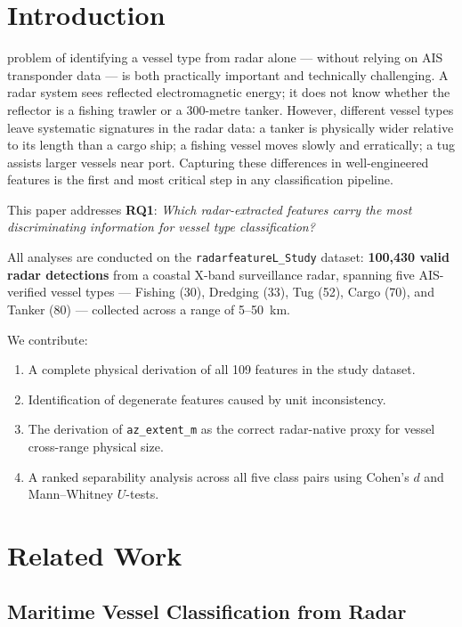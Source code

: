 \documentclass[journal]{IEEEtran}
\begin{document}
\section{Introduction}

 problem of identifying a vessel type from radar alone ---
without relying on AIS transponder data --- is both practically important and
technically challenging.
A radar system sees reflected electromagnetic energy; it does not know whether
the reflector is a fishing trawler or a 300-metre tanker. However, different
vessel types leave systematic signatures in the radar data: a tanker is physically
wider relative to its length than a cargo ship; a fishing vessel moves slowly and
erratically; a tug assists larger vessels near port. Capturing these differences
in well-engineered features is the first and most critical step in any
classification pipeline.

This paper addresses \textbf{RQ1}: \textit{Which radar-extracted features carry
the most discriminating information for vessel type classification?}

All analyses are conducted on the \texttt{radarfeatureL\_Study} dataset:
\textbf{100,430 valid radar detections} from a coastal X-band surveillance
radar, spanning five AIS-verified vessel types — Fishing (30), Dredging (33),
Tug (52), Cargo (70), and Tanker (80) — collected across a range of 5--50~km.

We contribute:
\begin{enumerate}
  \item A complete physical derivation of all 109 features in the study dataset.
  \item Identification of degenerate features caused by unit inconsistency.
  \item The derivation of \texttt{az\_extent\_m} as the correct radar-native
        proxy for vessel cross-range physical size.
  \item A ranked separability analysis across all five class pairs using
        Cohen's $d$ and Mann--Whitney $U$-tests.
\end{enumerate}

\section{Related Work}
\label{sec:relatedwork}

\subsection{Maritime Vessel Classification from Radar}
\end{document}
